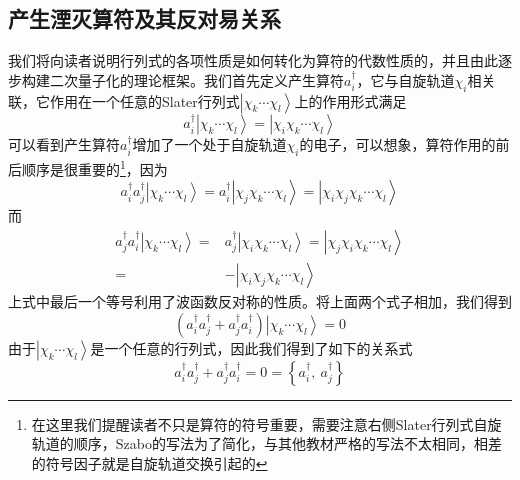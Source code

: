 \documentclass[12pt,a4paper,openany,twoside]{book}
\numberwithin{equation}{section}
\begin{document}
        \subsection{产生湮灭算符及其反对易关系} 
          我们将向读者说明行列式的各项性质是如何转化为算符的代数性质的，并且由此逐步构建二次量子化的理论框架。我们首先定义产生算符$a_i^{\dagger}$，它与自旋轨道$\chi_i$相关联，它作用在一个任意的Slater行列式$\left|\chi_k\cdots\chi_l\right\rangle$上的作用形式满足
          \begin{equation}
            a_i^{\dagger}\left|\chi_k\cdots\chi_l\right\rangle=\left|\chi_i\chi_k\cdots\chi_l\right\rangle
            \label{creation operator}
          \end{equation}
          可以看到产生算符$a_i^{\dagger}$增加了一个处于自旋轨道$\chi_i$的电子，可以想象，算符作用的前后顺序是很重要的\footnote{在这里我们提醒读者不只是算符的符号重要，需要注意右侧Slater行列式自旋轨道的顺序，Szabo的写法为了简化，与其他教材严格的写法不太相同，相差的符号因子就是自旋轨道交换引起的}，因为
          \begin{equation}
            a_i^{\dagger}a_j^{\dagger}\left|\chi_k\cdots\chi_l\right\rangle=a_i^{\dagger}
            \left|\chi_j\chi_k\cdots\chi_l\right\rangle=\left|\chi_i\chi_j\chi_k\cdots\chi_l\right\rangle
          \end{equation}
          而
          \begin{equation}
            \begin{aligned}
              a_j^{\dagger}a_i^{\dagger}\left|\chi_k\cdots\chi_l\right\rangle=&a_j^{\dagger}\left|\chi_i\chi_k\cdots\chi_l\right\rangle=\left|\chi_j\chi_i\chi_k\cdots\chi_l\right\rangle\\
              =&-\left|\chi_i\chi_j\chi_k\cdots\chi_l\right\rangle
            \end{aligned}
          \end{equation}
          上式中最后一个等号利用了波函数反对称的性质。将上面两个式子相加，我们得到
          \begin{equation}
            \left(a_i^{\dagger}a_j^{\dagger}+a_j^{\dagger}a_i^{\dagger}\right)
            \left|\chi_k\cdots\chi_l\right\rangle=0
          \end{equation}
          由于$\left|\chi_k\cdots\chi_l\right\rangle$是一个任意的行列式，因此我们得到了如下的关系式
          \begin{equation}
            a_i^{\dagger}a_j^{\dagger}+a_j^{\dagger}a_i^{\dagger}=0=\left\{a_i^{\dagger},\ a_j^{\dagger}\right\}
            \label{anti commutator creation}
          \end{equation}
\end{document}
